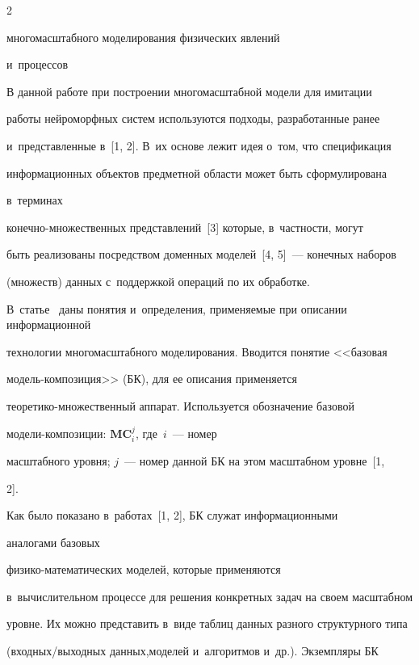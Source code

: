 \begin{multicols}{2}
{многомасштабного моделирования физических явлений 


и~процессов}





    В данной работе при построении многомасштабной модели для имитации 


работы нейроморфных систем используются подходы, разработанные ранее 


и~представленные в~[1, 2]. В~их основе лежит идея о~том, что спецификация 


информационных объектов предметной области может быть сформулирована 


в~терминах 


 ко\-неч\-но-мно\-жест\-вен\-ных представлений~[3] которые, в~част\-ности, могут 


быть реализованы посредством доменных моделей~[4, 5]~--- конечных наборов 


(множеств) данных с~поддержкой операций по их обработке. 


В~\mbox{статье}~\cite{2-ab} даны понятия и~определения, применяемые при описании информационной 


технологии многомасштабного моделирования. Вводится понятие <<базовая 


мод\-ель-ком\-по\-зи\-ция>> (БК), для ее описания применяется 


тео\-ре\-ти\-ко-мно\-жест\-вен\-ный аппарат. Используется обозначение базовой  


мо\-де\-ли-ком\-по\-зи\-ции: $\mathbf{MC}_i^j$, где~$i$~--- номер 


масштабного уровня; $j$~--- номер данной БК на этом масштабном уровне~[1, 


2]. 


    


    Как было показано в~работах~[1, 2], БК служат информационными 


аналогами базовых  


фи\-зи\-ко-ма\-те\-ма\-ти\-че\-ских моделей, которые применяются 


в~вычислительном процессе для решения \mbox{конкретных} задач на своем масштабном 


уровне. Их можно представить в~виде таблиц данных разного структурного типа 


(вход\-ных/вы\-ход\-ных данных,\linebreak моделей и~алгоритмов и~др.). Экземпляры БК 



\end{multicols}
